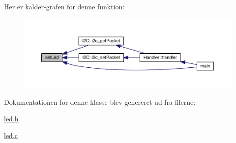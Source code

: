 Her er kalder-\/grafen for denne funktion\+:\nopagebreak
\begin{figure}[H]
\begin{center}
\leavevmode
\includegraphics[width=350pt]{d3/dbe/class_l_e_d_a1d8e725e3829da99c1d027ba0a2ce57a_icgraph}
\end{center}
\end{figure}




Dokumentationen for denne klasse blev genereret ud fra filerne\+:\begin{DoxyCompactItemize}
\item 
\hyperlink{led_8h}{led.\+h}\item 
\hyperlink{led_8c}{led.\+c}\end{DoxyCompactItemize}
